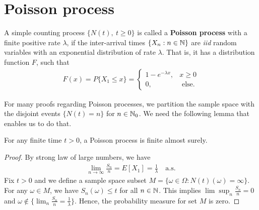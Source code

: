 \documentclass[a4paper,10pt,english]{article}
\begin{document}
\section{Poisson process}
A simple counting process $\{N(t),~ t\ge 0\} $ is called a \textbf{Poisson process} with a finite positive rate $\lambda$, 
if the inter-arrival times $\{X_{n}: n \in \mathbb{N}\}$ are \textit{iid} random variables with an exponential distribution of rate $\lambda$. 
That is, it has a distribution function $F$, such that 
 \begin{align*}
 F(x) = P\{X_{1}\le x\} = 
	\begin{cases}
		1-e^{-\lambda x}, & x\ge 0   \\
		0,  & \text{ else}.
	\end{cases}
\end{align*}

For many proofs regarding Poisson processes, 
we partition the sample space with the disjoint events $\{N(t) = n\}$ for $n \in \mathbb{N}_0$. 
We need the following lemma that enables us to do that. 
\begin{lem} For any finite time $t > 0$, a Poisson process is finite almost surely.
\end{lem}
\begin{proof} By strong law of large numbers, we have 
\begin{align*}
\lim_{n \to \infty} \frac{S_{n}}{n} = E[X_{1}] = \frac{1}{\lambda}\quad\mathrm{a.s.} 
\end{align*}
Fix $t > 0$ and we define a sample space subset $M = \{\omega \in \Omega: N(t)(\omega) = \infty \}$. 
For any $\omega \in M$, we have $S_{n}(\omega)\le t$ for all $n \in \mathbb{N}$. 
This implies $\lim\sup_n\frac{S_{n}}{n} = 0$  and $\omega \not\in \{\lim_n \frac{S_{n}}{n} = \frac{1}{\lambda} \}.$ Hence, the probability measure for set $M$ is zero. 
\end{proof}
\end{document}

